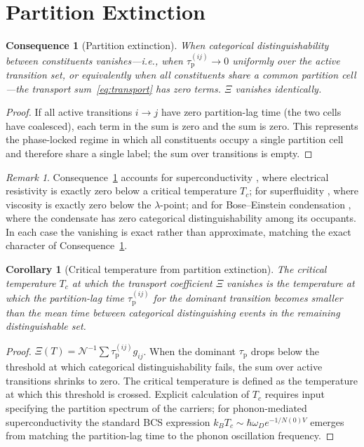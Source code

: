 \documentclass[11pt,twocolumn,a4paper]{article}
\theoremstyle{axiomstyle}
\theoremstyle{conseqstyle}
\newtheorem{consequence}{Consequence}
\newtheorem{corollary}{Corollary}
\theoremstyle{definition}
\theoremstyle{remark}
\newtheorem*{remark}{Remark}
\newcommand{\taup}{\tau_{\mathrm{p}}}
\begin{document}
\section{Partition Extinction}
\label{sec:partitionextinction}

\begin{consequence}[Partition extinction]
\label{cons:partitionextinction}
When categorical distinguishability between constituents vanishes---i.e., when $\taup^{(ij)}\to 0$ uniformly over the active transition set, or equivalently when all constituents share a common partition cell---the transport sum~\eqref{eq:transport} has zero terms. $\Xi$ vanishes identically.
\end{consequence}

\begin{proof}
If all active transitions $i\to j$ have zero partition-lag time (the two cells have coalesced), each term in the sum is zero and the sum is zero. This represents the phase-locked regime in which all constituents occupy a single partition cell and therefore share a single label; the sum over transitions is empty.
\end{proof}

\begin{remark}
Consequence~\ref{cons:partitionextinction} accounts for superconductivity \citep{onnes1911}, where electrical resistivity is exactly zero below a critical temperature $T_{c}$; for superfluidity \citep{kapitza1938}, where viscosity is exactly zero below the $\lambda$-point; and for Bose--Einstein condensation \citep{bose1924,andersonetal1995}, where the condensate has zero categorical distinguishability among its occupants. In each case the vanishing is exact rather than approximate, matching the exact character of Consequence~\ref{cons:partitionextinction}.
\end{remark}

\begin{corollary}[Critical temperature from partition extinction]
\label{cor:Tc}
The critical temperature $T_{c}$ at which the transport coefficient $\Xi$ vanishes is the temperature at which the partition-lag time $\taup^{(ij)}$ for the dominant transition becomes smaller than the mean time between categorical distinguishing events in the remaining distinguishable set.
\end{corollary}

\begin{proof}
$\Xi(T)=\mathcal{N}^{-1}\sum\taup^{(ij)}g_{ij}$. When the dominant $\taup$ drops below the threshold at which categorical distinguishability fails, the sum over active transitions shrinks to zero. The critical temperature is defined as the temperature at which this threshold is crossed. Explicit calculation of $T_{c}$ requires input specifying the partition spectrum of the carriers; for phonon-mediated superconductivity the standard BCS expression $k_{B}T_{c}\sim\hbar\omega_{D}e^{-1/N(0)V}$ emerges from matching the partition-lag time to the phonon oscillation frequency.
\end{proof}
\end{document}
